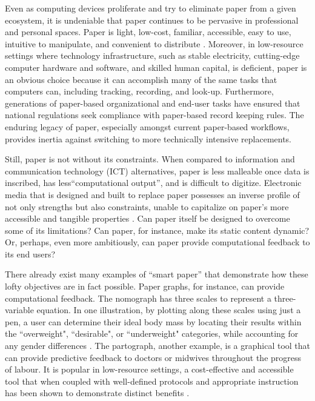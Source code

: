 \documentclass{sig-alternate}
\begin{document}
Even as computing devices proliferate and try to eliminate paper from a given ecosystem, it is undeniable that paper continues to be pervasive in professional and personal spaces.
Paper is light, low-cost, familiar, accessible, easy to use, intuitive to manipulate, and convenient to distribute \cite{sellen1997,sellen2002,johnson1993}. Moreover, in low-resource settings where technology infrastructure, such as stable electricity, cutting-edge computer hardware and software, and skilled human capital, is deficient, paper is an obvious choice because it can accomplish many of the same tasks that computers can, including tracking, recording, and look-up. Furthermore, generations of paper-based organizational and end-user tasks have ensured that national regulations seek compliance with paper-based record keeping rules. The enduring legacy of paper, especially amongst current paper-based workflows, provides inertia against switching to more technically intensive replacements. 

Still, paper is not without its constraints. When compared to information and communication technology (ICT) alternatives, paper is less malleable once data is inscribed, has less``computational output'', and is difficult to digitize. Electronic media that is designed and built to replace paper possesses an inverse profile of not only strengths but also constraints, unable to capitalize on paper's more accessible and tangible properties \cite{johnson1993}. Can paper itself be designed to overcome some of its limitations? Can paper, for instance, make its static content dynamic? Or, perhaps, even more ambitiously, can paper provide computational feedback to its end users?

There already exist many examples of ``smart paper'' that demonstrate how these lofty objectives are in fact possible. Paper graphs, for instance, can provide computational feedback. The nomograph has three scales to represent a three-variable equation. In one illustration, by plotting along these scales using just a pen, a user can determine their ideal body mass by locating their results within the ``overweight", ``desirable", or ``underweight" categories, while accounting for any gender differences \cite{thomas1976}. The partograph, another example, is a graphical tool that can provide predictive feedback to doctors or midwives throughout the progress of labour\cite{who1988}. It is popular in low-resource settings, a cost-effective and accessible tool that when coupled with well-defined protocols and appropriate instruction has been shown to demonstrate distinct benefits \cite{fawole2009, umezulike1999, fahdy2005, pettersson2000}.
\end{document}
